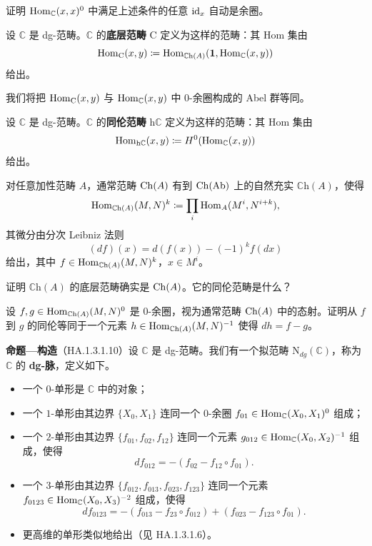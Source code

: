 \begin{exercise}\label{L17-2.8}
证明 $\operatorname{Hom}_{\mathbb{C}}(x,x)^0$ 中满足上述条件的任意 $\operatorname{id}_x$ 自动是余圈。
\end{exercise}

\begin{definition}\label{L17-2.9}
设 $\mathbb{C}$ 是 dg-范畴。$\mathbb{C}$ 的\textbf{底层范畴} $\mathrm{C}$ 定义为这样的范畴：其 Hom 集由
\[
\operatorname{Hom}_{\mathrm{C}}(x,y)\coloneqq\operatorname{Hom}_{\mathbb{C}\mathrm{h}(A)}(\mathbf{1},\operatorname{Hom}_{\mathbb{C}}(x,y))
\]
给出。
\end{definition}

\nitem\label{L17-2.10} 我们将把 $\operatorname{Hom}_{\mathrm{C}}(x,y)$ 与 $\operatorname{Hom}_{\mathbb{C}}(x,y)$ 中 $0$-余圈构成的 Abel 群等同。

\begin{definition}\label{L17-2.11}
设 $\mathbb{C}$ 是 dg-范畴。$\mathbb{C}$ 的\textbf{同伦范畴} $\mathrm{h}\mathbb{C}$ 定义为这样的范畴：其 Hom 集由
\[
\operatorname{Hom}_{\mathrm{h}\mathbb{C}}(x,y)\coloneqq H^0(\operatorname{Hom}_{\mathbb{C}}(x,y))
\]
给出。
\end{definition}

\begin{example}\label{L17-2.12}
对任意加性范畴 $A$，通常范畴 $\operatorname{Ch}(A)$ 有到 $\operatorname{Ch}(\operatorname{Ab})$ 上的自然充实 $\mathbb{C}\mathrm{h}(A)$，使得
\[
\operatorname{Hom}_{\mathbb{C}\mathrm{h}(A)}(M,N)^k\coloneqq\prod_i\operatorname{Hom}_A(M^i,N^{i+k}),
\]
其微分由分次 Leibniz 法则
\[
(df)(x)=d(f(x))-(-1)^k f(dx)
\]
给出，其中 $f\in\operatorname{Hom}_{\mathbb{C}\mathrm{h}(A)}(M,N)^k$，$x\in M^i$。
\end{example}

\begin{exercise}\label{L17-2.13}
证明 $\mathbb{C}\mathrm{h}(A)$ 的底层范畴确实是 $\operatorname{Ch}(A)$。它的同伦范畴是什么？
\end{exercise}

\begin{exercise}\label{L17-2.14}
设 $f,g\in\operatorname{Hom}_{\mathbb{C}\mathrm{h}(A)}(M,N)^0$ 是 $0$-余圈，视为通常范畴 $\operatorname{Ch}(A)$ 中的态射。证明从 $f$ 到 $g$ 的同伦等同于一个元素 $h\in\operatorname{Hom}_{\mathbb{C}\mathrm{h}(A)}(M,N)^{-1}$ 使得 $dh=f-g$。
\end{exercise}

\nitem\label{L17-2.15}\textbf{命题—构造}（HA.1.3.1.10）\quad 设 $\mathbb{C}$ 是 dg-范畴。我们有一个拟范畴 $\mathrm{N}_{dg}(\mathbb{C})$，称为 $\mathbb{C}$ 的 \textbf{dg-脉}，定义如下。
\begin{itemize}[leftmargin=2.2em,itemsep=0.1em]
\item 一个 $0$-单形是 $\mathbb{C}$ 中的对象；
\item 一个 $1$-单形由其边界 $\{X_0,X_1\}$ 连同一个 $0$-余圈 $f_{01}\in\operatorname{Hom}_{\mathbb{C}}(X_0,X_1)^0$ 组成；
\item 一个 $2$-单形由其边界 $\{f_{01},f_{02},f_{12}\}$ 连同一个元素 $g_{012}\in\operatorname{Hom}_{\mathbb{C}}(X_0,X_2)^{-1}$ 组成，使得
\[
df_{012}=-(f_{02}-f_{12}\circ f_{01}).
\]
\item 一个 $3$-单形由其边界 $\{f_{012},f_{013},f_{023},f_{123}\}$ 连同一个元素 $f_{0123}\in\operatorname{Hom}_{\mathbb{C}}(X_0,X_3)^{-2}$ 组成，使得
\[
df_{0123}=-(f_{013}-f_{23}\circ f_{012})+(f_{023}-f_{123}\circ f_{01}).
\]
\item 更高维的单形类似地给出（见 HA.1.3.1.6）。
\end{itemize}

